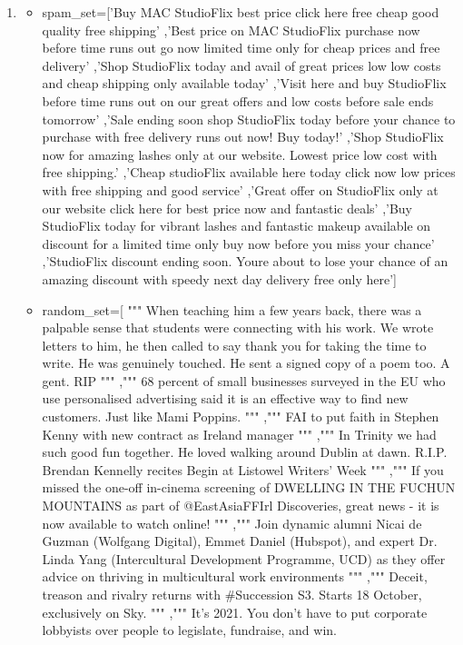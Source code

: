 \documentclass{article}
\begin{document}
\begin{enumerate}
	\item
	\begin{itemize}
	 \item spam\_set=['Buy MAC StudioFlix best price click here free cheap good quality free shipping'
	,'Best price on MAC StudioFlix purchase now before time runs out go now limited time only for cheap prices and free delivery'
	,'Shop StudioFlix today and avail of great prices low low costs and cheap shipping only available today'
	,'Visit here and buy StudioFlix before time runs out on our great offers and low costs before sale ends tomorrow'
	,'Sale ending soon shop StudioFlix today before your chance to purchase with free delivery runs out now! Buy today!'
	,'Shop StudioFlix now for amazing lashes only at our website. Lowest price low cost with free shipping.'
	,'Cheap studioFlix available here today click now low prices with free shipping and good service'
	,'Great offer on StudioFlix only at our website click here for best price now and fantastic deals'
	,'Buy StudioFlix today for vibrant lashes and fantastic makeup available on discount for a limited time only buy now before you miss your chance'
	,'StudioFlix discount ending soon. Youre about to lose your chance of an amazing discount with speedy next day delivery free only here']
	\item random\_set=[
	"""
	When teaching him a few years back, there was a palpable sense that students were connecting with his work. We wrote letters to him, he then called to say thank you for taking the time to write. He was genuinely touched. He sent a signed copy of a poem too. A gent. RIP
	"""
	,"""
	68 percent of small businesses surveyed in the EU who use personalised advertising said it is an effective way to find new customers. Just like Mami Poppins.
	"""
	,"""
	FAI to put faith in Stephen Kenny with new contract as Ireland manager
	"""
	,"""
	In Trinity we had such good fun together. He loved walking around Dublin at dawn. R.I.P. Brendan Kennelly recites Begin at Listowel Writers' Week 
	"""
	,"""
	If you missed the one-off in-cinema screening of DWELLING IN THE FUCHUN MOUNTAINS as part of 
	@EastAsiaFFIrl
	Discoveries, great news - it is now available to watch online! 
	"""
	,"""
	Join dynamic alumni Nicai de Guzman (Wolfgang Digital), Emmet Daniel (Hubspot), and expert Dr. Linda Yang (Intercultural Development Programme, UCD) as they offer advice on thriving in multicultural work environments
	"""
	,"""
	Deceit, treason and rivalry returns with \#Succession S3. Starts 18 October, exclusively on Sky.
	"""
	,"""
	It’s 2021. You don’t have to put corporate lobbyists over people to legislate, fundraise, and win. 
	

\end{itemize}
\end{enumerate}
\end{document}
